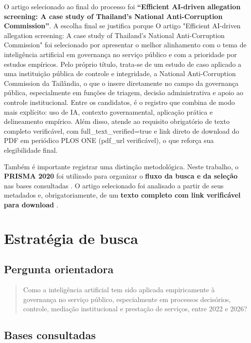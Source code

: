 \documentclass[12pt,a4paper]{article}
\begin{document}
O artigo selecionado ao final do processo foi \textbf{“Efficient AI-driven allegation screening: A case study of Thailand’s National Anti-Corruption Commission”}. A escolha final se justifica porque O artigo "Efficient AI-driven allegation screening: A case study of Thailand’s National Anti-Corruption Commission" foi selecionado por apresentar o melhor alinhamento com o tema de inteligência artificial em governança no serviço público e com a prioridade por estudos empíricos. Pelo próprio título, trata-se de um estudo de caso aplicado a uma instituição pública de controle e integridade, a National Anti-Corruption Commission da Tailândia, o que o insere diretamente no campo da governança pública, especialmente em funções de triagem, decisão administrativa e apoio ao controle institucional. Entre os candidatos, é o registro que combina de modo mais explícito: uso de IA, contexto governamental, aplicação prática e delineamento empírico. Além disso, atende ao requisito obrigatório de texto completo verificável, com full\_text\_verified=true e link direto de download do PDF em periódico PLOS ONE (pdf\_url verificável), o que reforça sua elegibilidade final.

Também é importante registrar uma distinção metodológica. Neste trabalho, o \textbf{PRISMA 2020} foi utilizado para organizar o \textbf{fluxo da busca e da seleção} nas bases consultadas \autocite{prisma2020statement}. O artigo selecionado foi analisado a partir de seus metadados e, obrigatoriamente, de um \textbf{texto completo com link verificável para download} \autocite{i2026efficient}.

\section{Estratégia de busca}
\label{sec:org59d7bb1}

\subsection{Pergunta orientadora}
\label{sec:org8f8adce}

\begin{quote}
Como a inteligência artificial tem sido aplicada empiricamente à governança no serviço público, especialmente em processos decisórios, controle, mediação institucional e prestação de serviços, entre 2022 e 2026?
\end{quote}

\subsection{Bases consultadas}
\label{sec:org9ccff7d}
\end{document}
